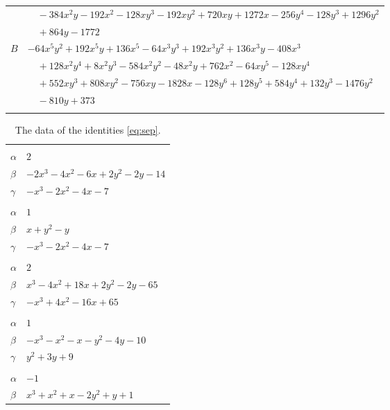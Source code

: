 \documentclass[11pt]{article}
\begin{document}
\begin{longtable}{@{}ll@{}}
 & $\quad -384x^{2}y-192x^{2}-128xy^{3}-192xy^{2}+720xy+1272x-256y^{4}-128y^{3}+1296y^{2}$\\
 & $\quad +864y-1772$\\
$B$ & $-64x^{5}y^{2}+192x^{5}y+136x^{5}-64x^{3}y^{3}+192x^{3}y^{2}+136x^{3}y-408x^{3}$\\
 & $\quad +128x^{2}y^{4}+8x^{2}y^{3}-584x^{2}y^{2}-48x^{2}y+762x^{2}-64xy^{5}-128xy^{4}$\\
 & $\quad +552xy^{3}+808xy^{2}-756xy-1828x-128y^{6}+128y^{5}+584y^{4}+132y^{3}-1476y^{2}$\\
 & $\quad -810y+373$\\
\addlinespace[3pt]
\end{longtable}
\endgroup

\begingroup\footnotesize
\setlength{\LTcapwidth}{\textwidth}
\begin{longtable}{@{}ll@{}}
\caption{The data of the identities \eqref{eq:sep}.}\label{tab:sep}\\
\hline\endfirsthead\hline\endhead\hline\endfoot
\multicolumn{2}{@{}l}{$\{i,j\}=\{0,2\}$, $k_{ij}=2^{2}\cdot 5$}\\
$\alpha$ & $2$\\
$\beta$ & $-2x^{3}-4x^{2}-6x+2y^{2}-2y-14$\\
$\gamma$ & $-x^{3}-2x^{2}-4x-7$\\
\addlinespace[3pt]
\multicolumn{2}{@{}l}{$\{i,j\}=\{0,3\}$, $k_{ij}=2\cdot 5$}\\
$\alpha$ & $1$\\
$\beta$ & $x+y^{2}-y$\\
$\gamma$ & $-x^{3}-2x^{2}-4x-7$\\
\addlinespace[3pt]
\multicolumn{2}{@{}l}{$\{i,j\}=\{0,7\}$, $k_{ij}=2^{9}$}\\
$\alpha$ & $2$\\
$\beta$ & $x^{3}-4x^{2}+18x+2y^{2}-2y-65$\\
$\gamma$ & $-x^{3}+4x^{2}-16x+65$\\
\addlinespace[3pt]
\multicolumn{2}{@{}l}{$\{i,j\}=\{1,5\}$, $k_{ij}=2^{3}\cdot 3$}\\
$\alpha$ & $1$\\
$\beta$ & $-x^{3}-x^{2}-x-y^{2}-4y-10$\\
$\gamma$ & $y^{2}+3y+9$\\
\addlinespace[3pt]
\multicolumn{2}{@{}l}{$\{i,j\}=\{1,8\}$, $k_{ij}=3$}\\
$\alpha$ & $-1$\\
$\beta$ & $x^{3}+x^{2}+x-2y^{2}+y+1$\\

\end{longtable}
\end{document}

